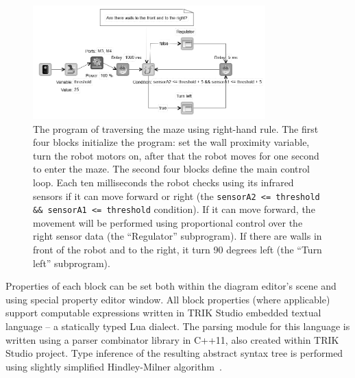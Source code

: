 \documentclass[conference]{IEEEtran}
\begin{document}
\begin{figure}[ht]
    \includegraphics[width=0.8\textwidth]{TS_CF_Labyrinth_Diagram.png}
    \caption{The program of traversing the maze using right-hand rule. The first four blocks initialize the program: set the wall proximity variable, turn the robot motors on, after that the robot moves for one second to enter the maze. The second four blocks define the main control loop. Each ten milliseconds the robot checks using its infrared sensors if it can move forward or right (the \texttt{sensorA2 <= threshold \&\& sensorA1 <= threshold} condition). If it can move forward, the movement will be performed using proportional control over the right sensor data (the ``Regulator'' subprogram). If there are walls in front of the robot and to the right, it turn 90 degrees left (the ``Turn left'' subprogram).}
    \label{image:TS_CF_Example}
\end{figure}

Properties of each block can be set both within the diagram editor's scene and using special property editor window. All block properties (where applicable) support computable expressions written in TRIK Studio embedded textual language -- a statically typed Lua dialect. The parsing module for this language is written using a parser combinator library in C++11, also created within TRIK Studio project. Type inference of the resulting abstract syntax tree is performed using slightly simplified Hindley-Milner algorithm~\cite{damas1982principal}.
\end{document}
